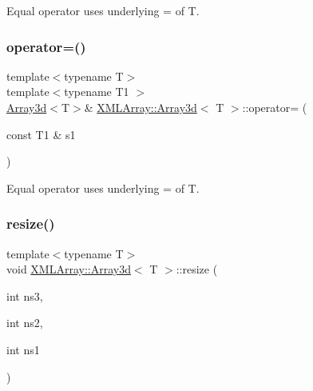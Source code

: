Equal operator uses underlying = of T. 

\mbox{\label{classXMLArray_1_1Array3d_a64543f39150c0d468eb6bef6ea73c1c6}} 
\subsubsection{\texorpdfstring{operator=()}{operator=()}\hspace{0.1cm}{\footnotesize\ttfamily [4/4]}}
{\footnotesize\ttfamily template$<$typename T$>$ \\
template$<$typename T1 $>$ \\
\mbox{\hyperlink{classXMLArray_1_1Array3d}{Array3d}}$<$T$>$\& \mbox{\hyperlink{classXMLArray_1_1Array3d}{X\+M\+L\+Array\+::\+Array3d}}$<$ T $>$\+::operator= (\begin{DoxyParamCaption}\item[{const T1 \&}]{s1 }\end{DoxyParamCaption})\hspace{0.3cm}{\ttfamily [inline]}}



Equal operator uses underlying = of T. 

\mbox{\label{classXMLArray_1_1Array3d_afe27b06ef40efdd87dbea00eafa35287}} 
\subsubsection{\texorpdfstring{resize()}{resize()}\hspace{0.1cm}{\footnotesize\ttfamily [1/2]}}
{\footnotesize\ttfamily template$<$typename T$>$ \\
void \mbox{\hyperlink{classXMLArray_1_1Array3d}{X\+M\+L\+Array\+::\+Array3d}}$<$ T $>$\+::resize (\begin{DoxyParamCaption}\item[{int}]{ns3,  }\item[{int}]{ns2,  }\item[{int}]{ns1 }\end{DoxyParamCaption})\hspace{0.3cm}{\ttfamily [inline]}}



